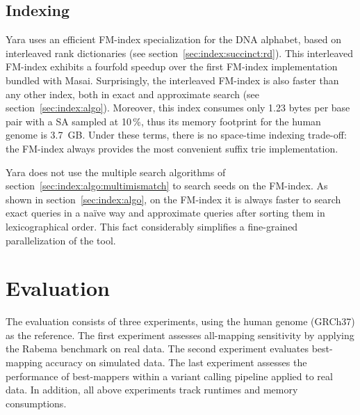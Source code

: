 \subsection{Indexing}
\label{sec:yara:eng:indexing}

Yara uses an efficient FM-index specialization for the DNA alphabet, based on interleaved rank dictionaries (see section~\ref{sec:index:succinct:rd}).
This interleaved FM-index exhibits a fourfold speedup over the first FM-index implementation bundled with Masai.
Surprisingly, the interleaved FM-index is also faster than any other index, both in exact and approximate search (see section~\ref{sec:index:algo}).
Moreover, this index consumes only 1.23 bytes per base pair with a SA sampled at 10\,\%, thus its memory footprint for the human genome is 3.7~GB.
Under these terms, there is no space-time indexing trade-off: the FM-index always provides the most convenient suffix trie implementation.

Yara does not use the multiple search algorithms of section~\ref{sec:index:algo:multimismatch} to search seeds on the FM-index.
As shown in section~\ref{sec:index:algo}, on the FM-index it is always faster to search exact queries in a na\"ive way and approximate queries after sorting them in lexicographical order.
This fact considerably simplifies a fine-grained parallelization of the tool.



\section{Evaluation}
\label{sec:yara:eval}

The evaluation consists of three experiments, using the human genome (GRCh37) as the reference.
The first experiment assesses all-mapping sensitivity by applying the Rabema benchmark on real data.
The second experiment evaluates best-mapping accuracy on simulated data.
The last experiment assesses the performance of best-mappers within a variant calling pipeline applied to real data.
In addition, all above experiments track runtimes and memory consumptions.



